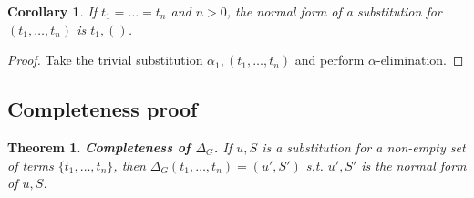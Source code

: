 \documentclass[a4paper, 11pt]{report}
\newtheorem{theorem}{Theorem}
\newtheorem{corollary}{Corollary}
\begin{document}
\begin{corollary}
If $t_1 = \dots = t_n$ and $n > 0$, the normal form of a substitution for $(t_1,\dots,t_n)$ is $t_1,()$.
\label{cor:allTermsEq}
\end{corollary}

\begin{proof}
Take the trivial substitution $\alpha_1,(t_1,\dots,t_n)$ and perform $\alpha$-elimination.
\end{proof}



\medskip


\subsection{Completeness proof}

\begin{theorem}
  \textbf{Completeness of $\Delta_G$.}
  If $u,S$ is a substitution for a non-empty set of terms $\{t_1,\dots,t_n\}$, then $\Delta_G(t_1,\dots,t_n) = (u',S')$ s.t. $u',S'$ is the normal form of $u,S$.
  \label{thm:DeltaGCompleteness}
\end{theorem}
\end{document}

